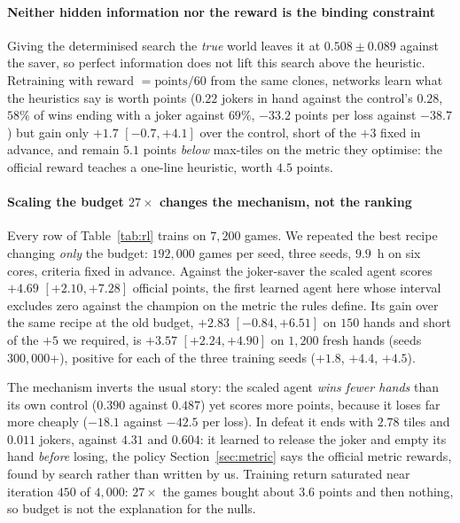 \documentclass[10pt,journal,compsoc]{IEEEtran}
\begin{document}
\paragraph*{Neither hidden information nor the reward is the binding constraint}
Giving the determinised search the \emph{true} world leaves it at $0.508\pm0.089$ against the saver, so perfect information does not lift this search above the heuristic. Retraining with reward $=\text{points}/60$ from the same clones, networks learn what the heuristics say is worth points ($0.22$ jokers in hand against the control's $0.28$, $58\%$ of wins ending with a joker against $69\%$, $-33.2$ points per loss against $-38.7$) but gain only $+1.7$ $[-0.7,+4.1]$ over the control, short of the $+3$ fixed in advance, and remain $5.1$ points \emph{below} max-tiles on the metric they optimise: the official reward teaches a one-line heuristic, worth $4.5$ points.

\paragraph*{Scaling the budget $27\times$ changes the mechanism, not the ranking}\label{sec:orcamento}
Every row of Table~\ref{tab:rl} trains on $7{,}200$ games. We repeated the best recipe changing \emph{only} the budget: $192{,}000$ games per seed, three seeds, $9.9$~h on six cores, criteria fixed in advance. Against the joker-saver the scaled agent scores $+4.69$ $[+2.10,+7.28]$ official points, the first learned agent here whose interval excludes zero against the champion on the metric the rules define. Its gain over the same recipe at the old budget, $+2.83$ $[-0.84,+6.51]$ on $150$ hands and short of the $+5$ we required, is $+3.57$ $[+2.24,+4.90]$ on $1{,}200$ fresh hands (seeds $300{,}000$+), positive for each of the three training seeds ($+1.8$, $+4.4$, $+4.5$).

The mechanism inverts the usual story: the scaled agent \emph{wins fewer hands} than its own control ($0.390$ against $0.487$) yet scores more points, because it loses far more cheaply ($-18.1$ against $-42.5$ per loss). In defeat it ends with $2.78$ tiles and $0.011$ jokers, against $4.31$ and $0.604$: it learned to release the joker and empty its hand \emph{before} losing, the policy Section~\ref{sec:metric} says the official metric rewards, found by search rather than written by us. Training return saturated near iteration $450$ of $4{,}000$: $27\times$ the games bought about $3.6$ points and then nothing, so budget is not the explanation for the nulls.
\end{document}

